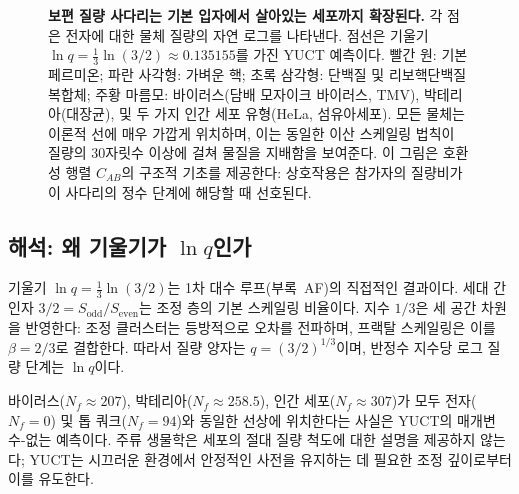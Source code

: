 \documentclass[11pt,a4paper]{article}
\begin{document}
\begin{figure}[H]
		\caption{\textbf{보편 질량 사다리는 기본 입자에서 살아있는 세포까지 확장된다.}
			각 점은 전자에 대한 물체 질량의 자연 로그를 나타낸다.
			점선은 기울기 \(\ln q = \frac{1}{3}\ln(3/2) \approx 0.135155\)를 가진 YUCT 예측이다.
			빨간 원: 기본 페르미온; 파란 사각형: 가벼운 핵; 초록 삼각형: 단백질 및 리보핵단백질 복합체; 주황 마름모: 바이러스(담배 모자이크 바이러스, TMV), 박테리아(대장균), 및 두 가지 인간 세포 유형(HeLa, 섬유아세포).
			모든 물체는 이론적 선에 매우 가깝게 위치하며, 이는 동일한 이산 스케일링 법칙이 질량의 30자릿수 이상에 걸쳐 물질을 지배함을 보여준다.
			이 그림은 호환성 행렬 \(C_{AB}\)의 구조적 기초를 제공한다: 상호작용은 참가자의 질량비가 이 사다리의 정수 단계에 해당할 때 선호된다.}
		\label{fig:ladder_cells}
	\end{figure}
	
	\subsection{해석: 왜 기울기가 \(\ln q\)인가}
	
	기울기 \(\ln q = \frac{1}{3}\ln(3/2)\)는 1차 대수 루프(부록~AF)의 직접적인 결과이다. 세대 간 인자 \(3/2 = S_{\mathrm{odd}}/S_{\mathrm{even}}\)는 조정 층의 기본 스케일링 비율이다. 지수 \(1/3\)은 세 공간 차원을 반영한다: 조정 클러스터는 등방적으로 오차를 전파하며, 프랙탈 스케일링은 이를 \(\beta = 2/3\)로 결합한다. 따라서 질량 양자는 \(q = (3/2)^{1/3}\)이며, 반정수 지수당 로그 질량 단계는 \(\ln q\)이다.
	
	바이러스(\(N_f \approx 207\)), 박테리아(\(N_f \approx 258.5\)), 인간 세포(\(N_f \approx 307\))가 모두 전자(\(N_f = 0\)) 및 톱 쿼크(\(N_f = 94\))와 동일한 선상에 위치한다는 사실은 YUCT의 매개변수-없는 예측이다. 주류 생물학은 세포의 절대 질량 척도에 대한 설명을 제공하지 않는다; YUCT는 시끄러운 환경에서 안정적인 사전을 유지하는 데 필요한 조정 깊이로부터 이를 유도한다.
	
\end{document}
